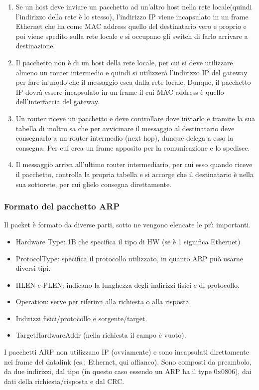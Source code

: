 \begin{enumerate}
  \item Se un host deve inviare un pacchetto ad un'altro host nella rete locale(quindi l'indirizzo della rete è lo stesso), l’indirizzo IP viene incapsulato in un frame Ethernet che ha come MAC address quello del destinatario vero e proprio e poi viene spedito sulla rete locale e si occupano gli switch di farlo arrivare a destinazione.
  \item Il pacchetto non è di un host della rete locale, per cui si deve utilizzare almeno un router intermedio e quindi si utilizzerà l’indirizzo IP del gateway per fare in modo che il messaggio esca dalla rete locale. Dunque, il pacchetto IP dovrà essere incapsulato in un frame il cui MAC address è quello dell’interfaccia del gateway.
  \item Un router riceve un pacchetto e deve controllare dove inviarlo e tramite la sua tabella di inoltro sa che per avvicinare il messaggio al destinatario deve consegnarlo a un router intermedio (next hop), dunque delega a esso la consegna. Per cui crea un frame apposito per la comunicazione e lo spedisce.
  \item Il messaggio arriva all’ultimo router intermediario, per cui esso quando riceve il pacchetto, controlla la propria tabella e si accorge che il destinatario è nella sua sottorete, per cui glielo consegna direttamente.
\end{enumerate}
\subsubsection{Formato del pacchetto ARP}
Il packet è formato da diverse parti, sotto ne vengono elencate le più importanti.
\begin{itemize}
  \item Hardware Type: 1B che specifica il tipo di HW (se è 1 significa Ethernet)
  \item ProtocolType: specifica il protocollo utilizzato, in quanto ARP può usarne diversi tipi.
  \item HLEN e PLEN: indicano la lunghezza degli indirizzi fisici e di protocollo.
  \item Operation: serve per riferirci alla richiesta o alla risposta.
  \item Indirizzi fisici/protocollo e sorgente/target.
  \item TargetHardwareAddr (nella richiesta il campo è vuoto).
\end{itemize}
I pacchetti ARP non utilizzano IP (ovviamente) e sono incapsulati direttamente nei frame del datalink (es.: Ethernet, qui affianco). Sono composti da preambolo, da due indirizzi, dal tipo (in questo caso essendo un ARP ha il type 0x0806), dai dati della richiesta/risposta e dal CRC.
